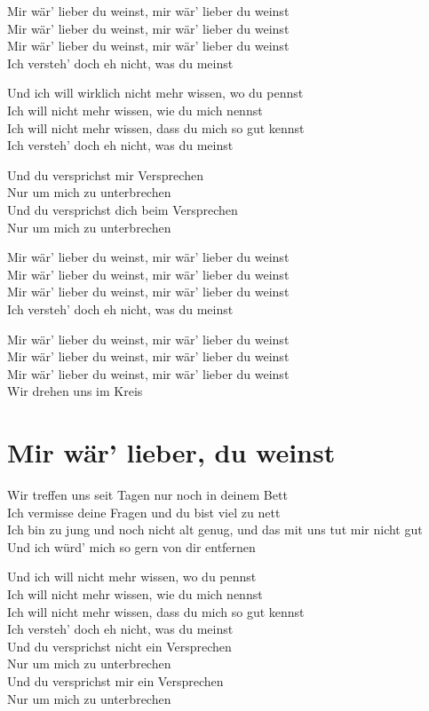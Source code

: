 \documentclass[]{book}
\begin{document}
Mir wär' lieber du weinst, mir wär' lieber du weinst\\
Mir wär' lieber du weinst, mir wär' lieber du weinst\\
Mir wär' lieber du weinst, mir wär' lieber du weinst\\
Ich versteh' doch eh nicht, was du meinst

Und ich will wirklich nicht mehr wissen, wo du pennst\\
Ich will nicht mehr wissen, wie du mich nennst\\
Ich will nicht mehr wissen, dass du mich so gut kennst\\
Ich versteh' doch eh nicht, was du meinst

Und du versprichst mir Versprechen\\
Nur um mich zu unterbrechen\\
Und du versprichst dich beim Versprechen\\
Nur um mich zu unterbrechen

Mir wär' lieber du weinst, mir wär' lieber du weinst\\
Mir wär' lieber du weinst, mir wär' lieber du weinst\\
Mir wär' lieber du weinst, mir wär' lieber du weinst\\
Ich versteh' doch eh nicht, was du meinst

Mir wär' lieber du weinst, mir wär' lieber du weinst\\
Mir wär' lieber du weinst, mir wär' lieber du weinst\\
Mir wär' lieber du weinst, mir wär' lieber du weinst\\
Wir drehen uns im Kreis

\hypertarget{mir-war-lieber-du-weinst-4}{%
\section{Mir wär' lieber, du weinst}\label{mir-war-lieber-du-weinst-4}}

Wir treffen uns seit Tagen nur noch in deinem Bett\\
Ich vermisse deine Fragen und du bist viel zu nett\\
Ich bin zu jung und noch nicht alt genug, und das mit uns tut mir nicht gut\\
Und ich würd' mich so gern von dir entfernen

Und ich will nicht mehr wissen, wo du pennst\\
Ich will nicht mehr wissen, wie du mich nennst\\
Ich will nicht mehr wissen, dass du mich so gut kennst\\
Ich versteh' doch eh nicht, was du meinst\\
Und du versprichst nicht ein Versprechen\\
Nur um mich zu unterbrechen\\
Und du versprichst mir ein Versprechen\\
Nur um mich zu unterbrechen
\end{document}
